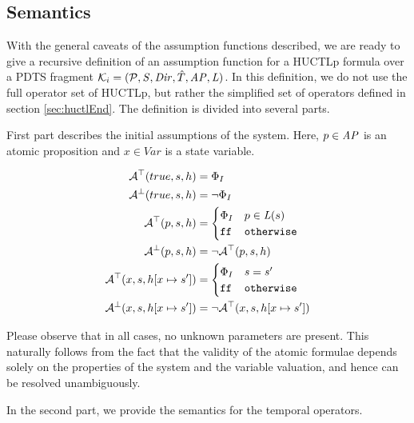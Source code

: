 \subsection{Semantics}

With the general caveats of the assumption functions described, we are ready to give a recursive definition of an assumption function for a \ac{HUCTLp} formula over a \ac{PDTS} fragment $\mathcal{K}_i = (\mathcal{P}, \mathit{S}, \mathit{Dir}, \hat{T}, \mathit{AP}, \mathit{L})$. In this definition, we do not use the full operator set of \ac{HUCTLp}, but rather the simplified set of operators defined in section \ref{sec:huctlEnd}. The definition is divided into several parts.

First part describes the initial assumptions of the system. Here, $p \in \mathit{AP}$ is an atomic proposition and $x \in Var$ is a state variable.

\begin{align*}
	\mathcal{A}^\top(true, s, h) & = \Phi_I \\
	\mathcal{A}^\bot(true, s, h) & = \neg \Phi_I \\
	\mathcal{A}^\top(p, s, h) & = 
	\begin{cases}
		\Phi_I & p \in \mathit{L}(s) \\
		\texttt{ff} & \texttt{otherwise} \\
	\end{cases}
	\\
	\mathcal{A}^\bot(p, s, h) & = \neg \mathcal{A}^\top(p, s, h) \\
	\mathcal{A}^\top(x, s, h[ x \mapsto s' ]) & = 
	\begin{cases}
		\Phi_I & s = s' \\
		\texttt{ff} & \texttt{otherwise}
	\end{cases}
	\\
	\mathcal{A}^\bot(x, s, h[ x \mapsto s']) & = \neg \mathcal{A}^\top(x, s, h[ x \mapsto s' ]) \\
\end{align*}

Please observe that in all cases, no unknown parameters are present. This naturally follows from the fact that the validity of the atomic formulae depends solely on the properties of the system and the variable valuation, and hence can be resolved unambiguously.

In the second part, we provide the semantics for the temporal operators.

